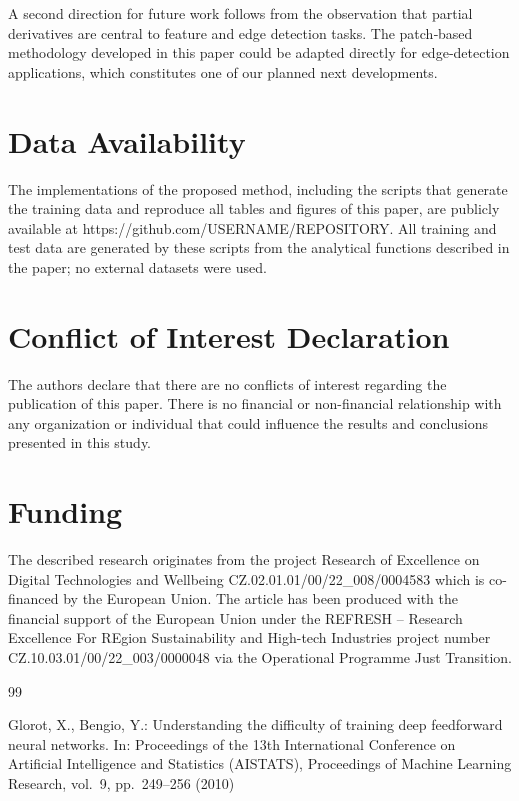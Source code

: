 \documentclass[pdflatex,sn-mathphys-num]{sn-jnl}%
\theoremstyle{thmstyleone}%
\theoremstyle{thmstyletwo}%
\theoremstyle{thmstylethree}%
\begin{document}
{A second direction for future work follows from the observation that partial derivatives are central to feature and edge detection tasks. The patch‑based methodology developed in this paper could be adapted directly for edge‑detection applications, which constitutes one of our planned next developments. 




\newpage
\section*{Data Availability}
The implementations of the proposed method, including the scripts that generate the training data and reproduce all tables and figures of this paper, are publicly available at https://github.com/USERNAME/REPOSITORY. All training and test data are generated by these scripts from the analytical functions described in the paper; no external datasets were used.

\section*{Conflict of Interest Declaration}
The authors declare that there are no conflicts of interest regarding the publication of this paper. There is no financial or non-financial relationship with any organization or individual that could influence the results and conclusions presented in this study.


\section*{Funding}
The described research originates from the project Research of Excellence on Digital Technologies and Wellbeing CZ.02.01.01/00/22\_008/0004583 which is co-financed by the European Union.
The article has been produced with the financial support of the European Union under the REFRESH – Research Excellence For REgion Sustainability and High-tech Industries project number CZ.10.03.01/00/22\_003/0000048 via the Operational Programme Just Transition.

\begin{thebibliography}{99}


Glorot, X., Bengio, Y.: Understanding the difficulty of training deep feedforward neural networks. In: Proceedings of the 13th International Conference on Artificial Intelligence and Statistics (AISTATS), Proceedings of Machine Learning Research, vol.~9, pp.~249--256 (2010)


\end{thebibliography}}
\end{document}
